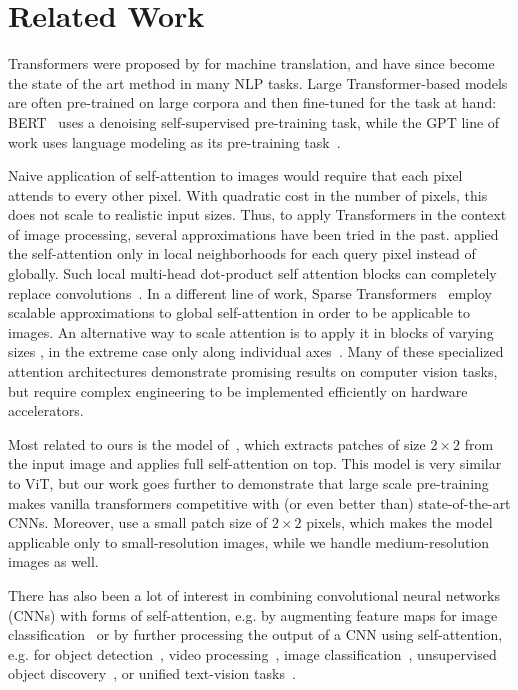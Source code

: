 \section{Related Work}

Transformers were proposed by \citet{vaswani2017} for machine translation, and have since become the state of the art method in many NLP tasks. Large Transformer-based models are often pre-trained on large corpora and then fine-tuned for the task at hand: BERT~\citep{devlin19-bert} uses a denoising self-supervised pre-training task, while the GPT line of work uses language modeling as its pre-training task~\citep{radford2018-gpt,radford2019-gpt2,brown2020-gpt3}.

Naive application of self-attention to images would require that each pixel attends to every other pixel. With quadratic cost in the number of pixels, this does not scale to realistic input sizes.
Thus, to apply Transformers in the context of image processing, several approximations have been tried in the past.
\citet{parmar18-imagetransformer} applied the self-attention only in local neighborhoods for each query pixel instead of globally.
Such local multi-head dot-product self attention blocks can completely replace convolutions~\citep{hu2019local,ramachandran19-sasa,zhao2020-san}.
In a different line of work, Sparse Transformers~\citep{child2019-sparsetransformers} employ scalable approximations to global self-attention in order to be applicable to images.
An alternative way to scale attention is to apply it in blocks of varying sizes \citep{weissenborn2019-savm}, in the extreme case only along individual axes~\citep{ho2019-axialattention,wang2020-axialdeeplab}.
Many of these specialized attention architectures demonstrate promising results on computer vision tasks, but require complex engineering to be implemented efficiently on hardware accelerators.

Most related to ours is the model of~\citet{cordonnier2020-sacnn}, which extracts patches of size $2 \times 2$ from the input image and applies full self-attention on top. This model is very similar to ViT, but our work goes further to demonstrate that large scale pre-training makes vanilla transformers competitive with (or even better than) state-of-the-art CNNs. Moreover, \citet{cordonnier2020-sacnn} use a small patch size of $2 \times 2$ pixels, which makes the model applicable only to small-resolution images, while we handle medium-resolution images as well.

There has also been a lot of interest in combining convolutional neural networks (CNNs) with forms of self-attention, e.g. by augmenting feature maps for image classification~\citep{bello2019-attentionaugmentedcnn} or by further processing the output of a CNN using self-attention, e.g. for object detection~\citep{hu2018-relationnetworks, carion20-detr}, video processing~\citep{wang2018-nonlocalnn,sun2019-videobert}, image classification~\citep{wu2020-visualtransformer}, unsupervised object discovery~\citep{locatello2020-slotattention}, or unified text-vision tasks~\citep{chenuniter,vilbert,visualbert}.

